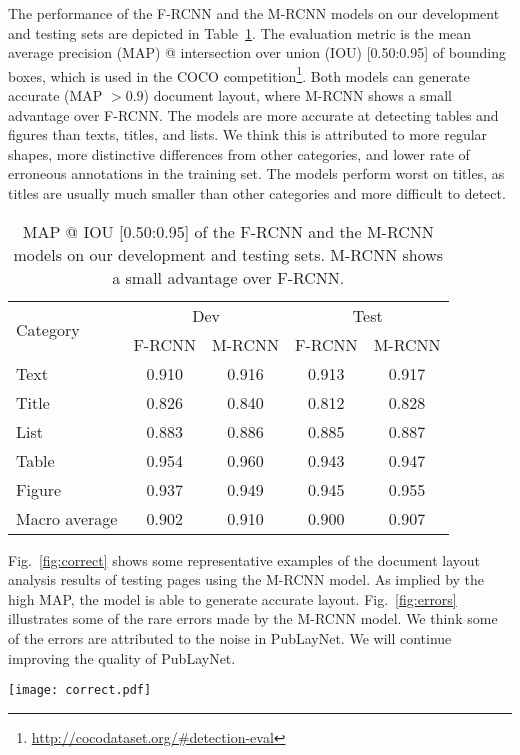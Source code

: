 \documentclass[conference]{IEEEtran}
\begin{document}
The performance of the F-RCNN and the M-RCNN models on our development and testing sets are depicted in Table~\ref{tab:eval}. The evaluation metric is the mean average precision (MAP) @ intersection over union (IOU) [0.50:0.95] of bounding boxes, which is used in the COCO competition\footnote{\url{http://cocodataset.org/#detection-eval}}. Both models can generate accurate (MAP $> 0.9$) document layout, where M-RCNN shows a small advantage over F-RCNN. The models are more accurate at detecting tables and figures than texts, titles, and lists. We think this is attributed to more regular shapes, more distinctive differences from other categories, and lower rate of erroneous annotations in the training set. The models perform worst on titles, as titles are usually much smaller than other categories and more difficult to detect.
\begin{table}[!htb]
  \caption{MAP @ IOU [0.50:0.95] of the F-RCNN and the M-RCNN models on our development and testing sets. M-RCNN shows a small advantage over F-RCNN.}
  \label{tab:eval}
  \centering
  \begin{tabular}{lcccc}
    \toprule
    \multirow{2}{*}{Category} & \multicolumn{2}{c}{Dev} & \multicolumn{2}{c}{Test} \\
    & F-RCNN & M-RCNN & F-RCNN & M-RCNN \\
    \midrule
    Text & 0.910 & 0.916 & 0.913 & 0.917 \\
    Title & 0.826 & 0.840 & 0.812 & 0.828 \\
    List & 0.883 & 0.886 & 0.885 & 0.887 \\
    Table & 0.954 & 0.960 & 0.943 & 0.947 \\
    Figure & 0.937 & 0.949 & 0.945 & 0.955 \\
    \midrule
    Macro average & 0.902 & 0.910 & 0.900 & 0.907 \\
    \bottomrule
\end{tabular}
\end{table}

Fig.~\ref{fig:correct} shows some representative examples of the document layout analysis results of testing pages using the M-RCNN model. As implied by the high MAP, the model is able to generate accurate layout. Fig.~\ref{fig:errors} illustrates some of the rare errors made by the M-RCNN model. We think some of the errors are attributed to the noise in PubLayNet. We will continue improving the quality of PubLayNet.

\begin{figure*}[!htb]
  \centering
  \texttt{[image: correct.pdf]}
  \caption{Representative examples of the document layout analysis results using the M-RCNN model. As implied by the high MAP, the model is able to generate accurate layout.}
  \label{fig:correct}
\end{figure*}
\end{document}
